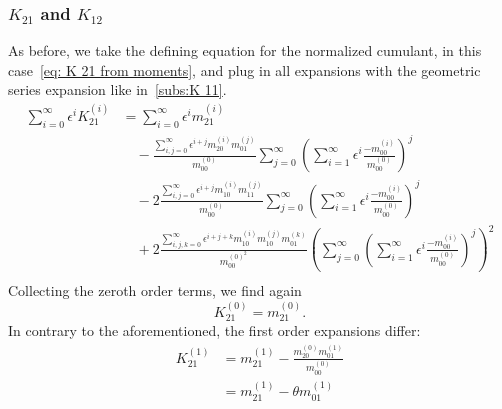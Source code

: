 \subsubsection{\texorpdfstring{$K_{21}$}{K 21} and \texorpdfstring{$K_{12}$}{K 12}}
\label{subs:K 21}
As before, we take the defining equation for the normalized cumulant, in this case~\eqref{eq: K 21 from moments}, and plug in all expansions with the geometric series expansion like in~\ref{subs:K 11}.
\begin{equation}
  \begin{aligned}
    \sum_{i=0}^\infty \epsilon^i K_{21}^{(i)}
    & = \sum_{i=0}^\infty \epsilon^i m_{21}^{(i)}
    \\ &\quad
    - \frac{\sum_{i,j=0}^\infty \epsilon^{i+j} m_{20}^{(i)} m_{01}^{(j)}}{m_{00}^{(0)}}
      \sum_{j=0}^\infty {\left(\sum_{i=1}^\infty \epsilon^i \frac{ - m_{00}^{(i)}}{ m_{00}^{(0)}}\right)}^j
    \\ &\quad
     - 2\frac{\sum_{i,j=0}^\infty \epsilon^{i+j} m_{10}^{(i)} m_{11}^{(j)}}{m_{00}^{(0)}}
      \sum_{j=0}^\infty {\left(\sum_{i=1}^\infty \epsilon^i \frac{ - m_{00}^{(i)}}{ m_{00}^{(0)}}\right)}^j
     \\ &\quad
     + 2\frac{\sum_{i,j,k=0}^\infty \epsilon^{i+j+k} m_{10}^{(i)} m_{10}^{(j)} m_{01}^{(k)}}{m_{00}^{{(0)}^2}}
      {\left(
        \sum_{j=0}^\infty {\left(\sum_{i=1}^\infty \epsilon^i \frac{ - m_{00}^{(i)}}{ m_{00}^{(0)}}\right)}^j
      \right)}^2\\
   \end{aligned}
\end{equation}
Collecting the zeroth order terms, we find again
\begin{equation}
  K_{21}^{(0)} = m_{21}^{(0)}.
\end{equation}
In contrary to the aforementioned, the first order expansions differ:
\begin{equation}
  \begin{aligned}
    K_{21}^{(1)} & = m_{21}^{(1)}
    - \frac{m_{20}^{(0)} m_{01}^{(1)}}{m_{00}^{(0)}}
    \\ &
    = m_{21}^{(1)} - \theta m_{01}^{(1)}
  \end{aligned}
\end{equation}

